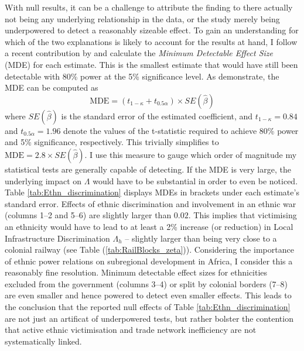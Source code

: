 \documentclass[11pt, oneside]{article}   	%
\let\oldref\ref
\renewcommand{\ref}[1]{(\oldref{#1})}
\begin{document}
With null results, it can be a challenge to attribute the finding to there actually not being any underlying relationship in the data, or the study merely being underpowered to detect a reasonably sizeable effect. To gain an understanding for which of the two explanations is likely to account for the results at hand, I follow a recent contribution by \cite{Haushofer_ShorttermImpactUnconditional_2016} and calculate the \emph{Minimum Detectable Effect Size} (MDE) for each estimate. This is the smallest estimate that would have still been detectable with 80\% power at the 5\% significance level. As \cite{Haushofer_ShorttermImpactUnconditional_2016} demonstrate, the MDE can be computed as
\begin{equation*}
  \textrm{MDE} = (t_{1-\kappa}+t_{0.5\alpha}) \times SE(\hat{\beta})
\end{equation*}
where $SE(\hat{\beta})$ is the standard error of the estimated coefficient, and $t_{1-\kappa}=0.84$ and $t_{0.5\alpha}=1.96$ denote the values of the t-statistic required to achieve 80\% power and 5\% significance, respectively. This trivially simplifies to $\textrm{MDE} = 2.8 \times SE(\hat{\beta})$. I use this measure to gauge which order of magnitude my statistical tests are generally capable of detecting. If the MDE is very large, the underlying impact on $\Lambda$ would have to be substantial in order to even be noticed. Table \eqref{tab:Ethn_discrimination} displays MDEs in brackets under each estimate's standard error. Effects of ethnic discrimination and involvement in an ethnic war (columns 1--2 and 5--6) are slightly larger than $0.02$. This implies that victimising an ethnicity would have to lead to at least a 2\% increase (or reduction) in Local Infrastructure Discrimination $\Lambda_{h}$ -- slightly larger than being very close to a colonial railway (see Table \ref{tab:RailBlocks_zeta}). Considering the importance of ethnic power relations on subregional development in Africa, I consider this a reasonably fine resolution. Minimum detectable effect sizes for ethnicities excluded from the government (columns 3--4) or split by colonial borders (7--8) are even smaller and hence powered to detect even smaller effects. This leads to the conclusion that the reported null effects of Table \eqref{tab:Ethn_discrimination} are not just an artificat of underpowered tests, but rather bolster the contention that active ethnic victimisation and trade network inefficiency are not systematically linked.
\end{document}
